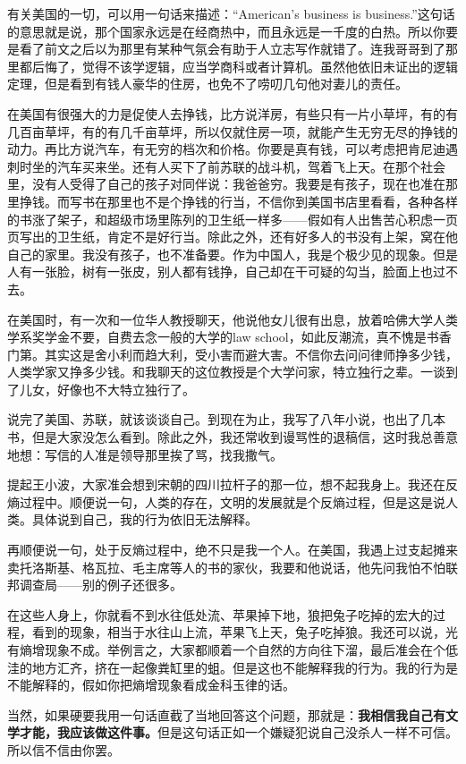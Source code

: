 \documentclass[12pt,a5paper]{ctexbook}
\begin{document}
有关美国的一切，可以用一句话来描述：“American's business is business.”这句话的意思就是说，那个国家永远是在经商热中，而且永远是一千度的白热。所以你要是看了前文之后以为那里有某种气氛会有助于人立志写作就错了。连我哥哥到了那里都后悔了，觉得不该学逻辑，应当学商科或者计算机。虽然他依旧未证出的逻辑定理，但是看到有钱人豪华的住房，也免不了唠叨几句他对妻儿的责任。

在美国有很强大的力是促使人去挣钱，比方说洋房，有些只有一片小草坪，有的有几百亩草坪，有的有几千亩草坪，所以仅就住房一项，就能产生无穷无尽的挣钱的动力。再比方说汽车，有无穷的档次和价格。你要是真有钱，可以考虑把肯尼迪遇刺时坐的汽车买来坐。还有人买下了前苏联的战斗机，驾着飞上天。在那个社会里，没有人受得了自己的孩子对同伴说：我爸爸穷。我要是有孩子，现在也准在那里挣钱。而写书在那里也不是个挣钱的行当，不信你到美国书店里看看，各种各样的书涨了架子，和超级市场里陈列的卫生纸一样多——假如有人出售苦心积虑一页页写出的卫生纸，肯定不是好行当。除此之外，还有好多人的书没有上架，窝在他自己的家里。我没有孩子，也不准备要。作为中国人，我是个极少见的现象。但是人有一张脸，树有一张皮，别人都有钱挣，自己却在干可疑的勾当，脸面上也过不去。

在美国时，有一次和一位华人教授聊天，他说他女儿很有出息，放着哈佛大学人类学系奖学金不要，自费去念一般的大学的law school，如此反潮流，真不愧是书香门第。其实这是舍小利而趋大利，受小害而避大害。不信你去问问律师挣多少钱，人类学家又挣多少钱。和我聊天的这位教授是个大学问家，特立独行之辈。一谈到了儿女，好像也不大特立独行了。

说完了美国、苏联，就该谈谈自己。到现在为止，我写了八年小说，也出了几本书，但是大家没怎么看到。除此之外，我还常收到谩骂性的退稿信，这时我总善意地想：写信的人准是领导那里挨了骂，找我撒气。

提起王小波，大家准会想到宋朝的四川拉杆子的那一位，想不起我身上。我还在反熵过程中。顺便说一句，人类的存在，文明的发展就是个反熵过程，但是这是说人类。具体说到自己，我的行为依旧无法解释。

再顺便说一句，处于反熵过程中，绝不只是我一个人。在美国，我遇上过支起摊来卖托洛斯基、格瓦拉、毛主席等人的书的家伙，我要和他说话，他先问我怕不怕联邦调查局——别的例子还很多。

在这些人身上，你就看不到水往低处流、苹果掉下地，狼把兔子吃掉的宏大的过程，看到的现象，相当于水往山上流，苹果飞上天，兔子吃掉狼。我还可以说，光有熵增现象不成。举例言之，大家都顺着一个自然的方向往下溜，最后准会在个低洼的地方汇齐，挤在一起像粪缸里的蛆。但是这也不能解释我的行为。我的行为是不能解释的，假如你把熵增现象看成金科玉律的话。

当然，如果硬要我用一句话直截了当地回答这个问题，那就是：\textbf{我相信我自己有文学才能，我应该做这件事。}但是这句话正如一个嫌疑犯说自己没杀人一样不可信。所以信不信由你罢。
\end{document}
